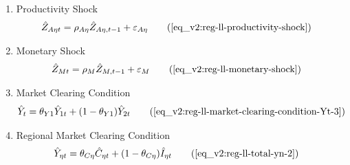 \documentclass[../thesis.tex]{subfiles}
\begin{document}
{\begin{itemize}
\begin{enumerate}
		\item Productivity Shock
		\begin{alignat}{2}
			\hat{Z}_{A\eta t} &= \rho_{A\eta} \hat{Z}_{A\eta, t-1} + \varepsilon_{A\eta} \tag{\ref{eq_v2:reg-ll-productivity-shock}}
		\end{alignat}
		
		\item Monetary Shock
		\begin{alignat}{2}
			\hat{Z}_{Mt} &= \rho_M \hat{Z}_{M,t-1} + \varepsilon_{M} \tag{\ref{eq_v2:reg-ll-monetary-shock}}
		\end{alignat}
		
		\item Market Clearing Condition
		\begin{align}
			\hat{Y}_{t} &= \theta_{Y1} \hat{Y}_{1t} + (1-\theta_{Y1}) \hat{Y}_{2t} \tag{\ref{eq_v2:reg-ll-market-clearing-condition-Yt-3}}
		\end{align}
		
		\item Regional Market Clearing Condition
		\begin{align}
			\hat{Y}_{\eta t} &= \theta_{C\eta} \hat{C}_{\eta t} + (1 - \theta_{C\eta}) \hat{I}_{\eta t} \tag{\ref{eq_v2:reg-ll-total-yn-2}}
		\end{align}
		
	\end{enumerate}
	
\end{itemize}

} %

\newpage
\end{document}
